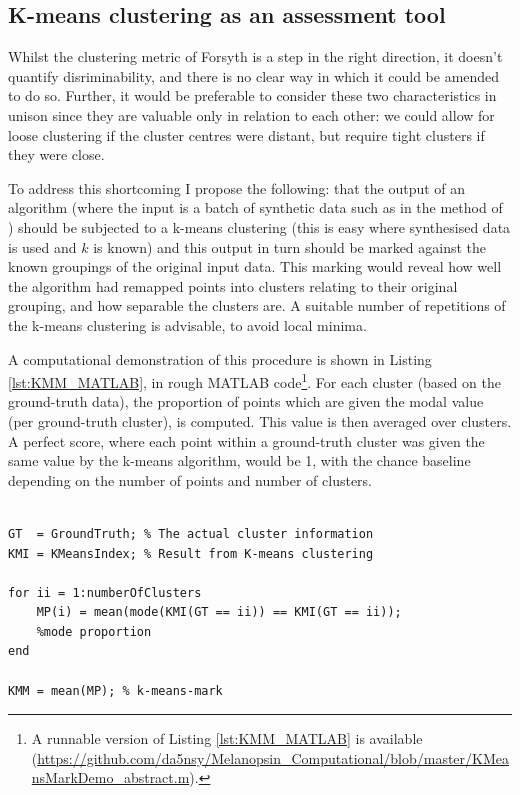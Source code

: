 \subsection{K-means clustering as an assessment tool}

Whilst the clustering metric of Forsyth is a step in the right direction, it doesn't quantify disriminability, and there is no clear way in which it could be amended to do so. Further, it would be preferable to consider these two characteristics in unison since they are valuable only in relation to each other: we could allow for loose clustering if the cluster centres were distant, but require tight clusters if they were close. 

To address this shortcoming I propose the following: that the output of an algorithm (where the input is a batch of synthetic data such as in the method of \citet{barnard_comparison_2002}) should be subjected to a k-means clustering (this is easy where synthesised data is used and $k$ is known) and this output in turn should be marked against the known groupings of the original input data. This marking would reveal how well the algorithm had remapped points into clusters relating to their original grouping, and how separable the clusters are. A suitable number of repetitions of the k-means clustering is advisable, to avoid local minima. 

A computational demonstration of this procedure is shown in Listing \ref{lst:KMM_MATLAB}, in rough \gls{MATLAB} code\footnote{A runnable version of Listing \ref{lst:KMM_MATLAB} is available (\url{https://github.com/da5nsy/Melanopsin_Computational/blob/master/KMeansMarkDemo_abstract.m}).}. For each cluster (based on the ground-truth data), the proportion of points which are given the modal value (per ground-truth cluster), is computed. This value is then averaged over clusters. A perfect score, where each point within a ground-truth cluster was given the same value by the k-means algorithm, would be 1, with the chance baseline depending on the number of points and number of clusters. 

\begin{lstlisting}[style = Matlab-editor, basicstyle = \mlttfamily, float = htbp, caption = Abstracted MATLAB code showing the k-means-mark computation, label = lst:KMM_MATLAB ]

GT  = GroundTruth; % The actual cluster information
KMI = KMeansIndex; % Result from K-means clustering

for ii = 1:numberOfClusters
    MP(i) = mean(mode(KMI(GT == ii)) == KMI(GT == ii)); 
    %mode proportion
end

KMM = mean(MP); % k-means-mark

\end{lstlisting}



